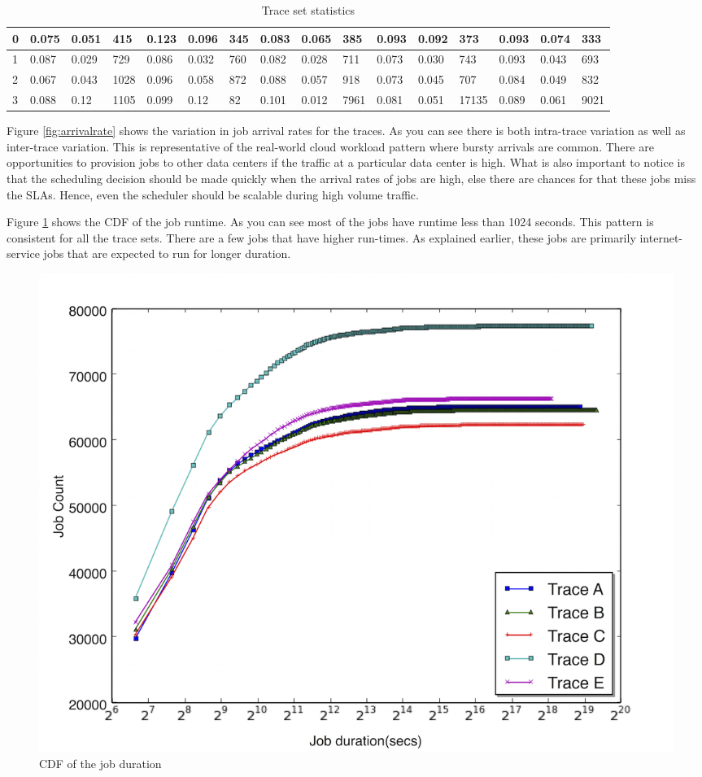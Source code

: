 \documentclass[letterpaper,twocolumn,12pt]{article}
\begin{document}
\begin{table}
{\begin{tabular}{|l|l|l|l|l|l|l|l|l|l|l|l|l|l|l|l|}
0 & 0.075 & 0.051 & 415 & 0.123 & 0.096 & 345 & 0.083 & 0.065 & 385 & 0.093 & 0.092 & 373 & 0.093 & 0.074 & 333 \\ \hline
1 & 0.087 & 0.029 & 729 & 0.086 & 0.032 & 760 & 0.082 & 0.028 & 711 & 0.073 & 0.030 & 743 & 0.093 & 0.043 & 693 \\ \hline
2 & 0.067 & 0.043 & 1028 & 0.096 & 0.058 & 872 & 0.088 & 0.057 & 918 & 0.073 & 0.045 & 707 & 0.084 & 0.049 & 832 \\ \hline
3 & 0.088 & 0.12 & 1105 & 0.099 & 0.12 & 82 & 0.101 & 0.012 & 7961 & 0.081 & 0.051 & 17135 & 0.089 & 0.061 & 9021 \\ \hline
\end{tabular}
}
\caption {Trace set statistics} \label{tab:tracestat} 
\end{table}

Figure \ref{fig:arrivalrate} shows the variation in job arrival rates for the traces. As you can see there is both intra-trace variation as well as inter-trace variation. This is representative of the real-world cloud workload pattern where bursty arrivals are common. There are opportunities to provision jobs to other data centers if the traffic at a particular data center is high. What is also important to notice is that the scheduling decision should be made quickly when the arrival rates of jobs are high, else there are chances for that these jobs miss the SLAs. Hence, even the scheduler should be scalable during high volume traffic. 

Figure \ref{fig:runtime} shows the CDF of the job runtime. As you can see most of the jobs have runtime less than 1024 seconds. This pattern is consistent for all the trace sets. There are a few jobs that have higher run-times. As explained earlier, these jobs are primarily internet-service jobs that are expected to run for longer duration. 


\begin{figure}[] 
\centering
\includegraphics[scale=0.25]{runtime}
\caption{CDF of the job duration}
\label{fig:runtime}
\end{figure}
\end{document}
